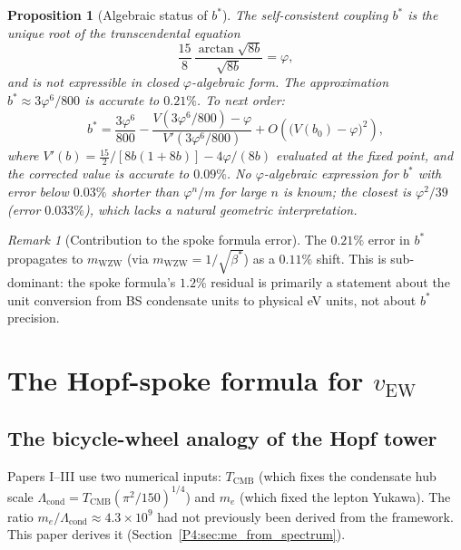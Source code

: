 \documentclass[11pt,a4paper]{article}
\newtheorem{proposition}[theorem]{Proposition}
\theoremstyle{definition}
\theoremstyle{remark}
\newtheorem{remark}[theorem]{Remark}
\newcommand{\vp}{\varphi}
\newcommand{\bst}{\beta^{*}}
\newcommand{\TCMB}{T_{\mathrm{CMB}}}
\newcommand{\Lcond}{\Lambda_{\mathrm{cond}}}
\begin{document}
\begin{proposition}[Algebraic status of $b^*$]
\label{P4:prop:bstar}
The self-consistent coupling $b^*$ is the unique root of the
transcendental equation
\begin{equation}
  \frac{15}{8}\,\frac{\arctan\!\sqrt{8b}}{\sqrt{8b}} = \vp,
  \label{P4:eq:bstar_eq}
\end{equation}
and is not expressible in closed $\vp$-algebraic form.  The approximation
$b^* \approx 3\vp^6/800$ is accurate to $0.21\%$.  To next order:
\begin{equation}
  b^* = \frac{3\vp^6}{800} - \frac{V(3\vp^6/800) - \vp}{V'(3\vp^6/800)}
  + O\!\left(\bigl(V(b_0)-\vp\bigr)^2\right),
  \label{P4:eq:bstar_newton}
\end{equation}
where $V'(b) = \tfrac{15}{2}/[8b(1{+}8b)] - 4\vp/(8b)$ evaluated at the
fixed point, and the corrected value is accurate to $0.09\%$.
No $\vp$-algebraic expression for $b^*$ with error below $0.03\%$
shorter than $\vp^n/m$ for large $n$ is known; the closest is $\vp^2/39$
(error $0.033\%$), which lacks a natural geometric interpretation.
\end{proposition}

\begin{remark}[Contribution to the spoke formula error]
\label{P4:rem:spoke_error_contribution}
The $0.21\%$ error in $b^*$ propagates to $m_\mathrm{WZW}$ (via
$m_\mathrm{WZW} = 1/\sqrt{\bst}$) as a $0.11\%$ shift.  This is
sub-dominant: the spoke formula's $1.2\%$ residual is primarily
a statement about the unit conversion from BS condensate units to
physical eV units, not about $b^*$ precision.
\end{remark}

\section{The Hopf-spoke formula for $v_{\mathrm{EW}}$}
\label{P4:sec:hopf_spoke}

\subsection{The bicycle-wheel analogy of the Hopf tower}

Papers I--III use two numerical inputs: $\TCMB$ (which fixes the
condensate hub scale $\Lcond = \TCMB(\pi^2/150)^{1/4}$) and $m_e$
(which fixed the lepton Yukawa).  The ratio $m_e/\Lcond \approx 4.3\times10^9$
had not previously been derived from the framework.
This paper derives it (Section~\ref{P4:sec:me_from_spectrum}).
\end{document}
